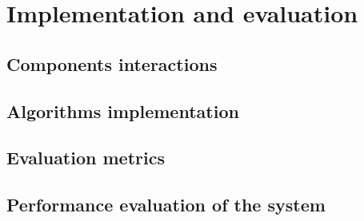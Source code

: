\chapter{Implementation and evaluation}
\section{Components interactions}
\section{Algorithms implementation}
\section{Evaluation metrics}
\section{Performance evaluation of the system}